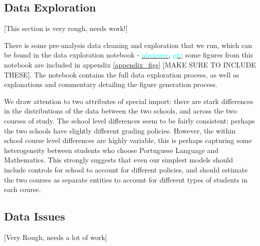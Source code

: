 \documentclass[12pt]{article}
\begin{document}
\subsection{Data Exploration}
\textcolor{BrickRed}{[This section is very rough, needs work!]}

There is some pre-analysis data cleaning and exploration that we run, which can be found in the data exploration notebook - \href{https://nbviewer.jupyter.org/github/nadavtadelis/Reproducible_Metrics/blob/master/data_exploration.ipynb}{\textcolor{cyan}{nbviewer}}, \href{https://github.com/nadavtadelis/Reproducible_Metrics/blob/master/data_exploration.ipynb}{\textcolor{cyan}{git}}; some figures from this notebook are included in appendix \ref{appendix_figs} \textcolor{BrickRed}{[MAKE SURE TO INCLUDE THESE]}. The notebook contains the full data exploration process, as well as explanations and commentary detailing the figure generation process.

We draw attention to two attributes of special import: there are stark differences in the distributions of the data between the two schools, and across the two courses of study. The school level differences seem to be fairly consistent; perhaps the two schools have slightly different grading policies. However, the within school course level differences are highly variable, this is perhaps capturing some heterogeneity between students who choose Portuguese Language and Mathematics. This strongly suggests that even our simplest models should include controls for school to account for different policies, and should estimate the two courses as separate entities to account for different types of students in each course.


\subsection{Data Issues} \label{data_issues}
\textcolor{BrickRed}{[Very Rough, needs a lot of work]}
\end{document}
